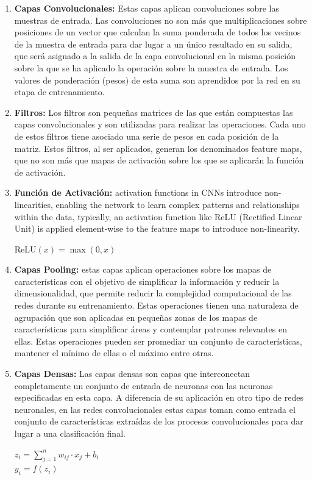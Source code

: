 \documentclass{uathesis-es}
\begin{document}
\begin{enumerate}
    \item \textbf{Capas Convolucionales:} Estas capas aplican convoluciones sobre las muestras de entrada. Las convoluciones no son más que multiplicaciones sobre posiciones de un vector que calculan la suma ponderada de todos los vecinos de la muestra de entrada para dar lugar a un único resultado en su salida, que será asignado a la salida de la capa convolucional en la misma posición sobre la que se ha aplicado la operación sobre la muestra de entrada. Los valores de ponderación (pesos) de esta suma son aprendidos por la red en su etapa de entrenamiento.
    
    \item \textbf{Filtros:} Los filtros son pequeñas matrices de las que están compuestas las capas convolucionales y son utilizadas para realizar las operaciones. Cada uno de estos filtros tiene asociado una serie de pesos en cada posición de la matriz. Estos filtros, al ser aplicados, generan los denominados feature maps, que no son más que mapas de activación sobre los que se aplicarán la función de activación.
    
    \item \textbf{Función de Activación:} activation functions in CNNs introduce non-linearities, enabling the network to learn complex patterns and relationships within the data, typically, an activation function like ReLU (Rectified Linear Unit) is applied element-wise to the feature maps to introduce non-linearity. \begin{center}
        $\text{ReLU}(x) = \max(0, x)$
    \end{center}
    
    \item \textbf{Capas Pooling:} estas capas aplican operaciones sobre los mapas de características con el objetivo de simplificar la información y reducir la dimensionalidad, que permite reducir la complejidad computacional de las redes durante su entrenamiento. Estas operaciones tienen una naturaleza de agrupación que son aplicadas en pequeñas zonas de los mapas de características para simplificar áreas y contemplar patrones relevantes en ellas. Estas operaciones pueden ser promediar un conjunto de características, mantener el mínimo de ellas o el máximo entre otras.
    
    \item \textbf{Capas Densas:} Las capas densas son capas que interconectan completamente un conjunto de entrada de neuronas con las neuronas especificadas en esta capa. A diferencia de su aplicación en otro tipo de redes neuronales, en las redes convolucionales estas capas toman como entrada el conjunto de características extraídas de los procesos convolucionales para dar lugar a una clasificación final.
    \begin{center}
        $z_i = \sum_{j=1}^{n} w_{ij} \cdot x_j + b_i$\\
        $y_i = f(z_i)$
    \end{center}
\end{enumerate}
\end{document}
